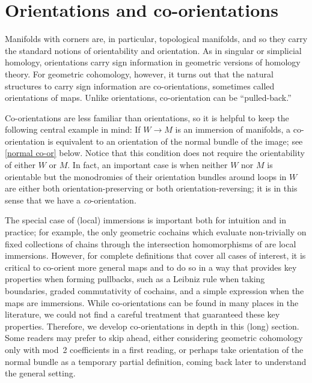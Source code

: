 
\section{Orientations and co-orientations}\label{S: orientations and co-orientations}

Manifolds with corners are, in particular, topological manifolds, and so they carry the standard notions of orientability and orientation.
As in singular or simplicial homology, orientations carry sign information in geometric versions of homology theory.
For geometric cohomology, however, it turns out that the natural structures to carry sign information are co-orientations, sometimes called orientations of maps.
Unlike orientations, co-orientation can be ``pulled-back.''

Co-orientations are less familiar than orientations, so it is helpful to keep the following central example in mind: If $W \to M$ is an immersion of manifolds, a co-orientation is equivalent to an orientation of the normal bundle of the image; see \cref{normal co-or} below.
Notice that this condition does not require the orientability of either $W$ or $M$.
In fact, an important case is when neither $W$ nor $M$ is orientable but the monodromies of their orientation bundles around loops in $W$ are either both orientation-preserving or both orientation-reversing; it is in this sense that we have a \textit{co}-orientation.

The special case of (local) immersions is important both for intuition and in practice; for example, the only geometric cochains which evaluate non-trivially on fixed collections of chains through the intersection homomorphisms of \cite{FMS-flows} are local immersions.
However, for complete definitions that cover all cases of interest, it is critical to co-orient more general maps and to do so in a way that provides key properties when forming pullbacks, such as a Leibniz rule when taking boundaries, graded commutativity of cochains, and a simple expression when the maps are immersions.
While co-orientations can be found in many places in the literature, we could not find a careful treatment that guaranteed these key properties.
Therefore, we develop co-orientations in depth in this (long) section.
Some readers may prefer to skip ahead, either considering geometric cohomology only with mod~2 coefficients in a first reading, or perhaps take orientation of the normal bundle as a temporary partial definition, coming back later to understand the general setting.

